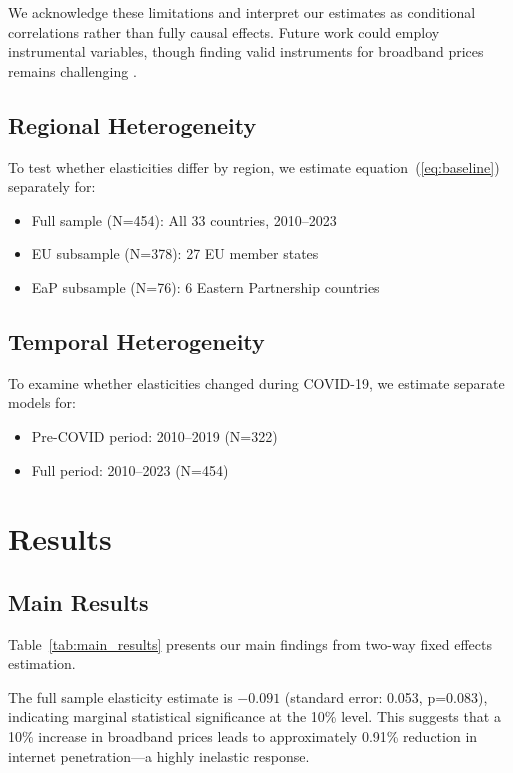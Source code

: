 \documentclass[12pt,review]{elsarticle}
\begin{document}
We acknowledge these limitations and interpret our estimates as conditional correlations rather than fully causal effects. Future work could employ instrumental variables, though finding valid instruments for broadband prices remains challenging \citep{hauge2010demand}.

\subsection{Regional Heterogeneity}

To test whether elasticities differ by region, we estimate equation~(\ref{eq:baseline}) separately for:
\begin{itemize}
\item Full sample (N=454): All 33 countries, 2010--2023
\item EU subsample (N=378): 27 EU member states
\item EaP subsample (N=76): 6 Eastern Partnership countries
\end{itemize}

\subsection{Temporal Heterogeneity}

To examine whether elasticities changed during COVID-19, we estimate separate models for:
\begin{itemize}
\item Pre-COVID period: 2010--2019 (N=322)
\item Full period: 2010--2023 (N=454)
\end{itemize}

\section{Results}
\label{sec:results}

\subsection{Main Results}

Table~\ref{tab:main_results} presents our main findings from two-way fixed effects estimation.



The full sample elasticity estimate is $-0.091$ (standard error: 0.053, p=0.083), indicating marginal statistical significance at the 10\% level. This suggests that a 10\% increase in broadband prices leads to approximately 0.91\% reduction in internet penetration---a highly inelastic response.
\end{document}
